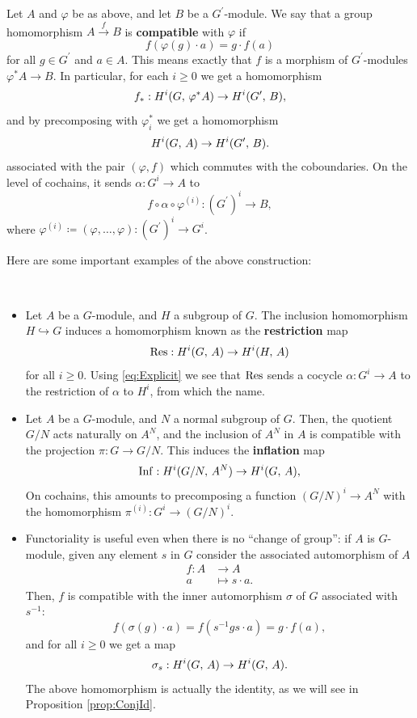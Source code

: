 \documentclass[a4paper, oneside]{memoir}
\begin{document}
\begin{definition}
	Let $A$ and $\varphi$ be as above, and let $B$ be a $G^{\prime} $-module. We say that a group homomorphism $A\overset{f}{\to} B$ is \textbf{compatible} with $\varphi$ if
	\[
		f(\varphi(g)\cdot a)=g\cdot f(a)
	\]
	for all $g\in G^{\prime} $ and $a\in A$. This means exactly that $f$ is a morphism of $G^{\prime} $-modules $\varphi^*A\to B$. In particular, for each $i\geq 0$ we get a homomorphism
	\[
		f_*: H^{i}( G, \, \varphi^*A )\to H^{i}( G^{\prime} , \, B ),
	\]
	and by precomposing with $\varphi_i^*$ we get a homomorphism
	\[
		H^{i}( G, \, A )\to H^{i}( G^{\prime} , \, B ).
	\]
	associated with the pair $(\varphi,f)$ which commutes with the coboundaries.
	On the level of cochains, it sends $\alpha: G^i\to A$ to
	\begin{equation*}\label{eq:Explicit} f \circ \alpha \circ \varphi^{(i)}: {(G^{\prime})}^i\to B, \end{equation*}
	where \(\varphi^{(i)} \coloneqq (\varphi, \dots ,\varphi): {(G^{\prime})}^i\to G^i \).
\end{definition}

Here are some important examples of the above construction:

\begin{definition}\label{def:InfRes}\
	\begin{itemize}
		\item[(a)]  Let $A$ be a $G$-module, and $H$ a subgroup of $G$. The inclusion homomorphism $H\hookrightarrow G$ induces a homomorphism known as the \textbf{restriction} map
		      \[
			      \operatorname{Res}: H^{i}( G, \, A )\to H^{i}( H, \, A )
		      \]
		      for all $i\geq 0$. Using \eqref{eq:Explicit} we see that $\operatorname{Res}$ sends a cocycle $\alpha: G^i\to A$ to the restriction of $\alpha$ to $H^i$, from which the name.
		\item[(b)] Let $A$ be a $G$-module, and $N$ a normal subgroup of $G$. Then, the quotient $G/N$ acts naturally on $A^N$, and the inclusion of $A^N$ in $A$ is compatible with the projection $\pi: G\to G/N$. This induces the \textbf{inflation} map
		      \[
			      \operatorname{Inf}: H^{i}( G/N, \, A^N )\to H^{i}( G, \, A ),
		      \]
		      On cochains, this amounts to precomposing a function $(G/N)^i\to A^N$ with the homomorphism $\pi^{(i)}: G^i\to (G/N)^i$.

		\item[(c)] Functoriality is useful even when there is no ``change of group'': if $A$ is $G$-module, given any element $s$ in $G$ consider the associated automorphism of $A$
		      \begin{align*}
			      f: A & \to A            \\
			      a    & \mapsto s\cdot a
			      .\end{align*}
		      Then, $f$ is compatible with the inner automorphism $\sigma$ of $G$ associated with $s^{-1}$:
		      \[
			      f(\sigma(g)\cdot a)=f(s^{-1}gs\cdot a)=g\cdot f(a),
		      \]
		      and for all $i\geq 0$ we get a map
		      \[
			      \sigma_s: H^{i}( G, \, A )\to H^{i}( G, \, A )
			      .\]
		      The above homomorphism is actually the identity, as we will see in Proposition \ref{prop:ConjId}.
	\end{itemize}
\end{definition}
\end{document}
